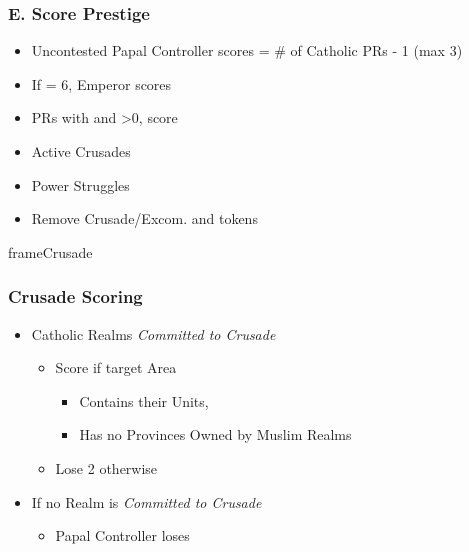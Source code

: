 \documentclass[10pt]{article}
\begin{document}
\subsubsection*{E. Score Prestige}
\begin{itemize}
	\item Uncontested Papal Controller scores \prestige = \# of Catholic PRs - 1 (max 3)
	\item If \authority = 6, Emperor scores 
	\item PRs with  and \stability>0, score 
	\item Active Crusades
	\item Power Struggles
	\item Remove Crusade/Excom. and \battlegroundarea tokens
\end{itemize}
\begin{dynamiccontents*}{frameCrusade}
	\subsubsection*{Crusade Scoring }
	\begin{itemize}
		\item Catholic Realms \emph{Committed to Crusade}
		\begin{itemize}
			\item Score  if target Area
			\begin{itemize}
				\item Contains their Units, 
				\item Has no Provinces Owned by Muslim Realms
			\end{itemize}
			\item Lose 2 otherwise
		\end{itemize}
		\item If no Realm is \emph{Committed to Crusade}
		\begin{itemize}
			\item Papal Controller loses 
		\end{itemize}
	\end{itemize}
\end{dynamiccontents*}
\end{document}
